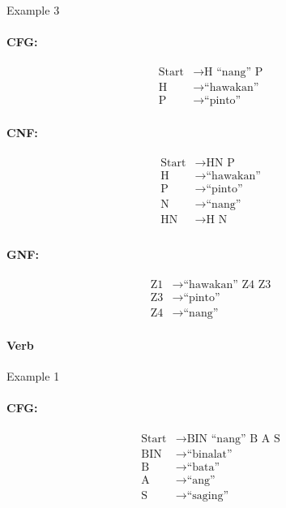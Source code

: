 Example 3
\paragraph{CFG:}
\begin{equation*}
    \begin{aligned}
        \text{Start}   & \rightarrow \text{H “nang” P}   \\
        \text{H} & \rightarrow \text{“hawakan”} \\
        \text{P} & \rightarrow \text{“pinto”}
    \end{aligned}
\end{equation*}

\paragraph{CNF:}
\begin{equation*}
    \begin{aligned}
        \text{Start}   & \rightarrow \text{HN P}   \\
        \text{H} & \rightarrow \text{“hawakan”} \\
        \text{P} & \rightarrow \text{“pinto”} \\
        \text{N} & \rightarrow \text{“nang”} \\
        \text{HN} & \rightarrow \text{H N} \\
    \end{aligned}
\end{equation*}

\paragraph{GNF:}
\begin{equation*}
    \begin{aligned}
        \text{Z1}   & \rightarrow \text{“hawakan” Z4 Z3}   \\
        \text{Z3} & \rightarrow \text{“pinto”} \\
        \text{Z4} & \rightarrow \text{“nang”}
    \end{aligned}
\end{equation*}


\paragraph{Verb}
Example 1
\paragraph{CFG:}
\begin{equation*}
    \begin{aligned}
        \text{Start}   & \rightarrow \text{BIN “nang” B A S}   \\
        \text{BIN} & \rightarrow \text{“binalat”} \\
        \text{B} & \rightarrow \text{“bata”} \\
        \text{A} & \rightarrow \text{“ang”} \\
        \text{S} & \rightarrow \text{“saging”}
    \end{aligned}
\end{equation*}

